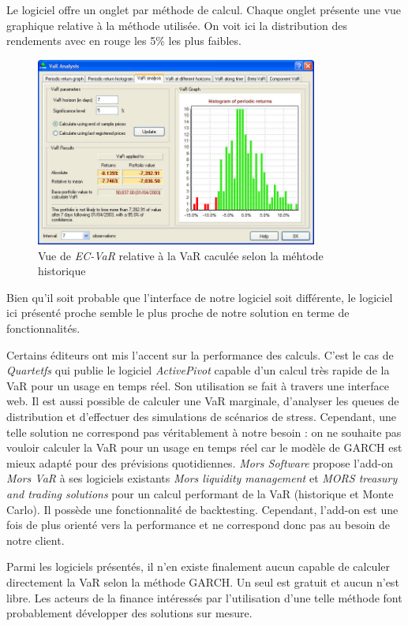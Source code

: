 		Le logiciel offre un onglet par méthode de calcul. Chaque onglet présente une vue graphique relative à la méthode utilisée. On voit ici la distribution des rendements avec en rouge les 5\% les plus faibles.

		\begin{figure}[h]
			\center
			\includegraphics[width=350px]{ecvar_1b.jpg}
			\caption{Vue de \textit{EC-VaR} relative à la VaR caculée selon la méhtode historique}
			\label{ajustement_garch}
		\end{figure}

		Bien qu’il soit probable que l’interface de notre logiciel soit différente, le logiciel ici présenté proche semble le plus proche de notre solution en terme de fonctionnalités. %

		Certains éditeurs ont mis l’accent sur la performance des calculs. C’est le cas de \textit{Quartetfs} qui publie le logiciel \textit{ActivePivot} capable d’un calcul très rapide de la VaR pour un usage en temps réel. Son utilisation se fait à travers une interface web. Il est aussi possible de calculer une VaR marginale, d’analyser les queues de distribution et d’effectuer des simulations de scénarios de stress. Cependant, une telle solution ne correspond pas véritablement à notre besoin : on ne souhaite pas vouloir calculer la VaR pour un usage en temps réel car le modèle de GARCH est mieux adapté pour des prévisions quotidiennes.	\textit{Mors Software} propose l’add-on \textit{Mors VaR} à ses logiciels existants \textit{Mors liquidity management} et \textit{MORS treasury and trading solutions} pour un calcul performant de la VaR (historique et Monte Carlo). Il possède une fonctionnalité de backtesting. Cependant, l’add-on est une fois de plus orienté vers la performance et ne correspond donc pas au besoin de notre client.

		Parmi les logiciels présentés, il n’en existe finalement aucun capable de calculer directement la VaR selon la méthode GARCH. Un seul est gratuit et aucun n’est libre. Les acteurs de la finance intéressés par l’utilisation d’une telle méthode font probablement développer des solutions sur mesure.